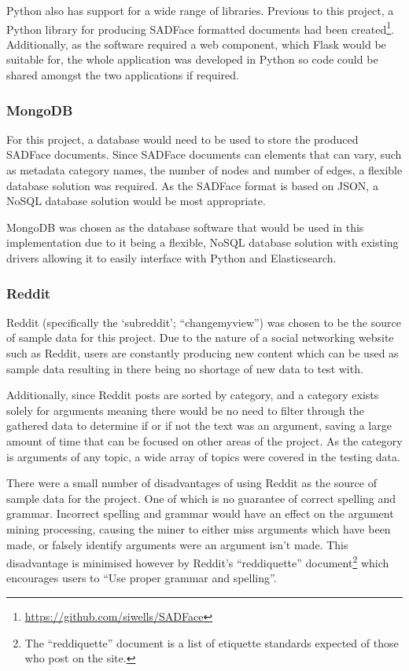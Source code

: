 \documentclass[12pt,a4paper]{article}
\begin{document}
Python also has support for a wide range of libraries. Previous to this project, a Python library for producing SADFace formatted documents had been created\footnote{\url{https://github.com/siwells/SADFace}}. Additionally, as the software required a web component, which Flask would be suitable for, the whole application was developed in Python so code could be shared amongst the two applications if required.

\subsubsection{MongoDB}

For this project, a database would need to be used to store the produced SADFace documents. Since SADFace documents can elements that can vary, such as metadata category names, the number of nodes and number of edges, a flexible database solution was required. As the SADFace format is based on JSON, a NoSQL database solution would be most appropriate. 

MongoDB was chosen as the database software that would be used in this implementation due to it being a flexible, NoSQL database solution with existing drivers allowing it to easily interface with Python and Elasticsearch.

\subsubsection{Reddit}

Reddit (specifically the `subreddit'; ``changemyview'') was chosen to be the source of sample data for this project. Due to the nature of a social networking website such as Reddit, users are constantly producing new content which can be used as sample data resulting in there being no shortage of new data to test with.

Additionally, since Reddit posts are sorted by category, and a category exists solely for arguments meaning there would be no need to filter through the gathered data to determine if or if not the text was an argument, saving a large amount of time that can be focused on other areas of the project. As the category is arguments of any topic, a wide array of topics were covered in the testing data.

There were a small number of disadvantages of using Reddit as the source of sample data for the project. One of which is no guarantee of correct spelling and grammar.  Incorrect spelling and grammar would have an effect on the argument mining processing, causing the miner to either miss arguments which have been made, or falsely identify arguments were an argument isn't made. This disadvantage is minimised however by Reddit's ``reddiquette'' document\footnote{The ``reddiquette'' document is a list of etiquette standards expected of those who post on the site.} which encourages users to ``Use proper grammar and spelling''.
\end{document}
